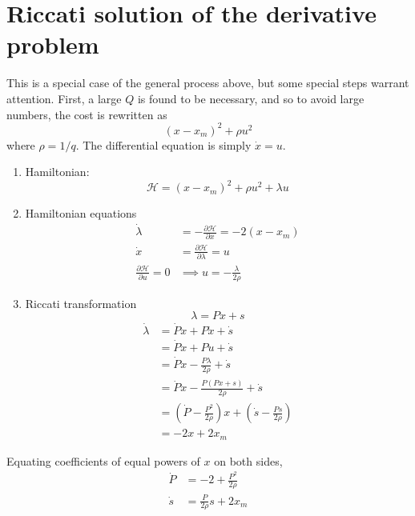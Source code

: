 \documentclass[11pt]{article}
\begin{document}
\section{Riccati solution of the derivative problem}
This is a special case of the general process above,
but some special steps warrant attention.
First, a large $Q$ is found to be necessary, and so to avoid large numbers, 
the cost is rewritten as 
\begin{equation*}
    (x-x_m)^2 + \rho u^2
\end{equation*}
where $\rho = 1/q$. The differential equation is simply $\dot{x} = u$.
\begin{enumerate}
    \item Hamiltonian:
        \begin{equation*}
            \mathcal{H} = (x-x_m)^2 + \rho u^2 + \lambda u
        \end{equation*}
    \item Hamiltonian equations
        \begin{align*}
            \dot{\lambda} &= -\frac{\partial\mathcal{H}}{\partial x} = -2(x - x_m) \\
            \dot{x} &= \frac{\partial\mathcal{H}}{\partial\lambda} = u \\
            \frac{\partial\mathcal{H}}{\partial u} = 0 &\implies u = -\frac{\lambda}{2\rho}
        \end{align*}
    \item Riccati transformation
        \begin{equation*}
            \lambda = P x + s
        \end{equation*}
        \begin{align*}
            \dot{\lambda} &= \dot{P} x + P\dot{x} + \dot{s} \\
                          &= \dot{P} x + Pu + \dot{s} \\
                          &= \dot{P} x - \frac{P \lambda}{2\rho} + \dot{s} \\
                          &= \dot{P} x - \frac{P (P x + s)}{2\rho} + \dot{s} \\
                          &= \left(\dot{P} - \frac{P^2}{2\rho}\right)x + \left(\dot{s}-\frac{P s}{2\rho}\right) \\
                          &= -2x + 2x_m
        \end{align*}
\end{enumerate}
Equating coefficients of equal powers of $x$ on both sides,
\begin{align*}
    \dot{P} &= -2 + \frac{P^2}{2\rho} \\
    \dot{s} &= \frac{P}{2\rho}s + 2 x_m
\end{align*}
\end{document}
